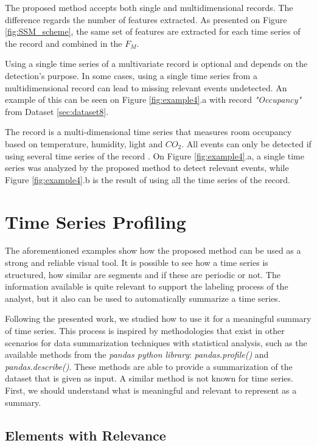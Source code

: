 The proposed method accepts both single and multidimensional records. The difference regards the number of features extracted. As presented on Figure \ref{fig:SSM_scheme}, the same set of features are extracted for each time series of the record and combined in the $F_M$. 
\par
Using a single time series of a multivariate record is optional and depends on the detection's purpose. In some cases, using a single time series from a multidimensional record can lead to missing relevant events undetected. An example of this can be seen on Figure \ref{fig:example4}.a with record \textit{"Occupancy"} from Dataset \ref{sec:dataset8}. 
\par
The record is a multi-dimensional time series that measures room occupancy based on temperature, humidity, light and $CO_2$. All events can only be detected if using several time series of the record \cite{cpd_alan}. On Figure \ref{fig:example4}.a, a single time series was analyzed by the proposed method to detect relevant events, while Figure \ref{fig:example4}.b is the result of using all the time series of the record.

\section{Time Series Profiling}

The aforementioned examples show how the proposed method can be used as a strong and reliable visual tool. It is possible to see how a time series is structured, how similar are segments and if these are periodic or not. The information available is quite relevant to support the labeling process of the analyst, but it also can be used to automatically summarize a time series. 
\par
Following the presented work, we studied how to use it for a meaningful summary of time series. This process is inspired by methodologies that exist in other scenarios for data summarization techniques with statistical analysis, such as the available methods from the \textit{pandas python library}: \textit{pandas.profile()} and \textit{pandas.describe()}. These methods are able to provide a summarization of the dataset that is given as input. A similar method is not known for time series. First, we should understand what is meaningful and relevant to represent as a summary.

\subsection{Elements with Relevance}

